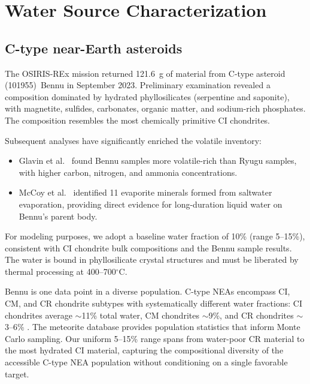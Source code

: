 \documentclass[preprint,12pt]{elsarticle}
\begin{document}
\section{Water Source Characterization}
\label{sec:sources}

\subsection{C-type near-Earth asteroids}
\label{sec:asteroid}

The OSIRIS-REx mission returned 121.6~g of material from C-type asteroid (101955)~Bennu in September 2023. Preliminary examination \cite{lauretta2024} revealed a composition dominated by hydrated phyllosilicates (serpentine and saponite), with magnetite, sulfides, carbonates, organic matter, and sodium-rich phosphates. The composition resembles the most chemically primitive CI chondrites.

Subsequent analyses have significantly enriched the volatile inventory:
\begin{itemize}
    \item Glavin et al.\ \cite{glavin2025} found Bennu samples more volatile-rich than Ryugu samples, with higher carbon, nitrogen, and ammonia concentrations.
    \item McCoy et al.\ \cite{mccoy2025} identified 11 evaporite minerals formed from saltwater evaporation, providing direct evidence for long-duration liquid water on Bennu's parent body.
\end{itemize}

For modeling purposes, we adopt a baseline water fraction of 10\% (range 5--15\%), consistent with CI chondrite bulk compositions and the Bennu sample results. The water is bound in phyllosilicate crystal structures and must be liberated by thermal processing at 400--700$^\circ$C.

Bennu is one data point in a diverse population. C-type NEAs encompass CI, CM, and CR chondrite subtypes with systematically different water fractions: CI chondrites average $\sim$11\% total water, CM chondrites $\sim$9\%, and CR chondrites $\sim$3--6\% \cite{alexander2012}. The meteorite database provides population statistics that inform Monte Carlo sampling. Our uniform 5--15\% range spans from water-poor CR material to the most hydrated CI material, capturing the compositional diversity of the accessible C-type NEA population without conditioning on a single favorable target.
\end{document}

